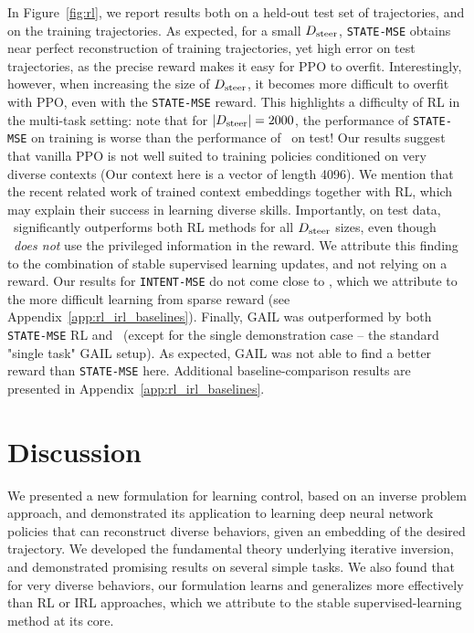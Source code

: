 \documentclass[nohyperref]{article}
\begin{document}
In Figure~\ref{fig:rl}, we report results both on a held-out test set of trajectories, and on the training trajectories. As expected, for a small $D_{\mathrm{steer}}$, \texttt{STATE-MSE} obtains near perfect reconstruction of training trajectories, yet high error on test trajectories, as the precise reward makes it easy for PPO to overfit. Interestingly, however, when increasing the size of $D_{\mathrm{steer}}$, it becomes more difficult to overfit with PPO, even with the \texttt{STATE-MSE} reward. This highlights a difficulty of RL in the multi-task setting: note that for $|D_{\mathrm{steer}}|=2000$, the performance of \texttt{STATE-MSE} on training is worse than the performance of \methodname\ on test! 
Our results suggest that vanilla PPO is not well suited to training policies conditioned on very diverse contexts (Our context here is a vector of length 4096). We mention that the recent related work of \citet{peng2022ase} trained context embeddings together with RL, which may explain their success in learning diverse skills. 
Importantly, on test data, \methodname\ significantly outperforms both RL methods for all $D_{\mathrm{steer}}$ sizes, even though \methodname\ \textit{does not} use the privileged information in the reward. We attribute this finding to the combination of stable supervised learning updates, and not relying on a reward. 
Our results for \texttt{INTENT-MSE} do not come close to \methodname, which we attribute to the more difficult learning from sparse reward (see Appendix~\ref{app:rl_irl_baselines}). 
Finally, GAIL was outperformed by both \texttt{STATE-MSE} RL and \methodname\ (except for the single demonstration case -- the standard "single task" GAIL setup). As expected, GAIL was not able to find a better reward than \texttt{STATE-MSE} here.
Additional baseline-comparison results are presented in Appendix~\ref{app:rl_irl_baselines}.
























\section{Discussion}
We presented a new formulation for learning control, based on an inverse problem approach, and demonstrated its application to learning deep neural network policies that can reconstruct diverse behaviors, given an embedding of the desired trajectory. 
We developed the fundamental theory underlying iterative inversion, and demonstrated promising results on several simple tasks. We also found that for very diverse behaviors, our formulation learns and generalizes more effectively than RL or IRL approaches, which we attribute to the stable supervised-learning method at its core.
\end{document}
